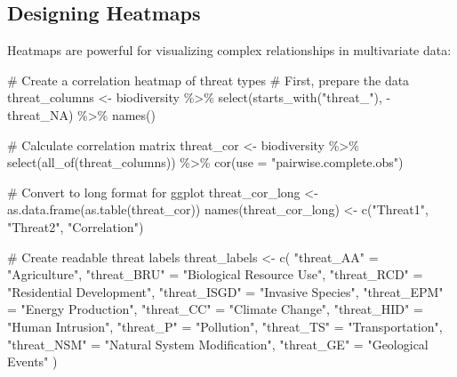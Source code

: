 \documentclass[
  letterpaper,
]{book}
\newenvironment{Shaded}{\begin{snugshade}}{\end{snugshade}}
\newcommand{\AttributeTok}[1]{\textcolor[rgb]{0.40,0.45,0.13}{#1}}
\newcommand{\CommentTok}[1]{\textcolor[rgb]{0.37,0.37,0.37}{#1}}
\newcommand{\FunctionTok}[1]{\textcolor[rgb]{0.28,0.35,0.67}{#1}}
\newcommand{\NormalTok}[1]{\textcolor[rgb]{0.00,0.23,0.31}{#1}}
\newcommand{\OtherTok}[1]{\textcolor[rgb]{0.00,0.23,0.31}{#1}}
\newcommand{\SpecialCharTok}[1]{\textcolor[rgb]{0.37,0.37,0.37}{#1}}
\newcommand{\StringTok}[1]{\textcolor[rgb]{0.13,0.47,0.30}{#1}}
\begin{document}
\subsection{Designing Heatmaps}\label{designing-heatmaps}

Heatmaps are powerful for visualizing complex relationships in
multivariate data:

\begin{Shaded}
\begin{Highlighting}[]
\CommentTok{\# Create a correlation heatmap of threat types}
\CommentTok{\# First, prepare the data}
\NormalTok{threat\_columns }\OtherTok{\textless{}{-}}\NormalTok{ biodiversity }\SpecialCharTok{\%\textgreater{}\%}
  \FunctionTok{select}\NormalTok{(}\FunctionTok{starts\_with}\NormalTok{(}\StringTok{"threat\_"}\NormalTok{), }\SpecialCharTok{{-}}\NormalTok{threat\_NA) }\SpecialCharTok{\%\textgreater{}\%}
  \FunctionTok{names}\NormalTok{()}

\CommentTok{\# Calculate correlation matrix}
\NormalTok{threat\_cor }\OtherTok{\textless{}{-}}\NormalTok{ biodiversity }\SpecialCharTok{\%\textgreater{}\%}
  \FunctionTok{select}\NormalTok{(}\FunctionTok{all\_of}\NormalTok{(threat\_columns)) }\SpecialCharTok{\%\textgreater{}\%}
  \FunctionTok{cor}\NormalTok{(}\AttributeTok{use =} \StringTok{"pairwise.complete.obs"}\NormalTok{)}

\CommentTok{\# Convert to long format for ggplot}
\NormalTok{threat\_cor\_long }\OtherTok{\textless{}{-}} \FunctionTok{as.data.frame}\NormalTok{(}\FunctionTok{as.table}\NormalTok{(threat\_cor))}
\FunctionTok{names}\NormalTok{(threat\_cor\_long) }\OtherTok{\textless{}{-}} \FunctionTok{c}\NormalTok{(}\StringTok{"Threat1"}\NormalTok{, }\StringTok{"Threat2"}\NormalTok{, }\StringTok{"Correlation"}\NormalTok{)}

\CommentTok{\# Create readable threat labels}
\NormalTok{threat\_labels }\OtherTok{\textless{}{-}} \FunctionTok{c}\NormalTok{(}
  \StringTok{"threat\_AA"} \OtherTok{=} \StringTok{"Agriculture"}\NormalTok{,}
  \StringTok{"threat\_BRU"} \OtherTok{=} \StringTok{"Biological Resource Use"}\NormalTok{,}
  \StringTok{"threat\_RCD"} \OtherTok{=} \StringTok{"Residential Development"}\NormalTok{,}
  \StringTok{"threat\_ISGD"} \OtherTok{=} \StringTok{"Invasive Species"}\NormalTok{,}
  \StringTok{"threat\_EPM"} \OtherTok{=} \StringTok{"Energy Production"}\NormalTok{,}
  \StringTok{"threat\_CC"} \OtherTok{=} \StringTok{"Climate Change"}\NormalTok{,}
  \StringTok{"threat\_HID"} \OtherTok{=} \StringTok{"Human Intrusion"}\NormalTok{,}
  \StringTok{"threat\_P"} \OtherTok{=} \StringTok{"Pollution"}\NormalTok{,}
  \StringTok{"threat\_TS"} \OtherTok{=} \StringTok{"Transportation"}\NormalTok{,}
  \StringTok{"threat\_NSM"} \OtherTok{=} \StringTok{"Natural System Modification"}\NormalTok{,}
  \StringTok{"threat\_GE"} \OtherTok{=} \StringTok{"Geological Events"}
\NormalTok{)}


\end{Highlighting}
\end{Shaded}
\end{document}
